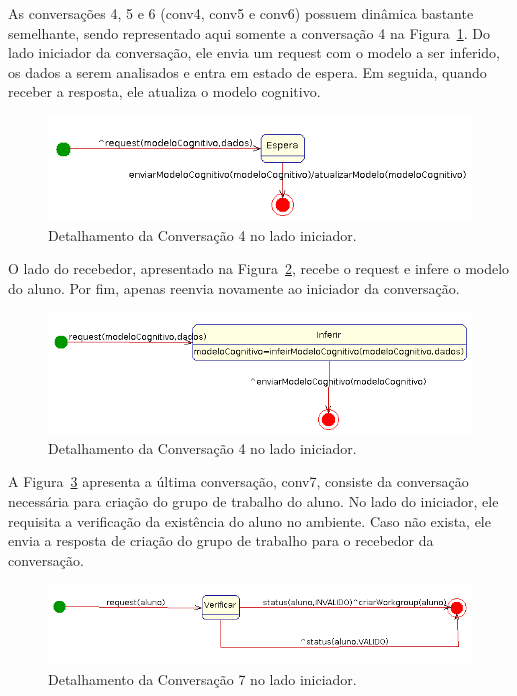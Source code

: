 As conversações 4, 5 e 6 (conv4, conv5 e conv6) possuem dinâmica bastante semelhante, sendo representado aqui somente a conversação 4 na Figura~\ref{fig:conv4-iniciador}. Do lado iniciador da conversação, ele envia um request com o modelo a ser inferido, os dados a serem analisados e entra em estado de espera. Em seguida, quando receber a resposta, ele atualiza o modelo cognitivo.
\begin{figure}
	\centering
	\includegraphics[scale=0.48]{images/conv4-iniciador.png}
	\caption{Detalhamento da Conversação 4 no lado iniciador.}
	\label{fig:conv4-iniciador}
\end{figure}

O lado do recebedor, apresentado na Figura~\ref{fig:conv4-recebedor}, recebe o request e infere o modelo do aluno. Por fim, apenas reenvia novamente ao iniciador da conversação.
\begin{figure}
	\centering
	\includegraphics[scale=0.48]{images/conv4-recebedor.png}
	\caption{Detalhamento da Conversação 4 no lado iniciador.}
	\label{fig:conv4-recebedor}
\end{figure}

A Figura~\ref{fig:conv7-iniciador} apresenta a última conversação, conv7, consiste da conversação necessária para criação do grupo de trabalho do aluno. No lado do iniciador, ele requisita a verificação da existência do aluno no ambiente. Caso não exista, ele envia a resposta de criação do grupo de trabalho para o recebedor da conversação.
\begin{figure}
	\centering
	\includegraphics[scale=0.48]{images/conv7-iniciador.png}
	\caption{Detalhamento da Conversação 7 no lado iniciador.}
	\label{fig:conv7-iniciador}
\end{figure}

